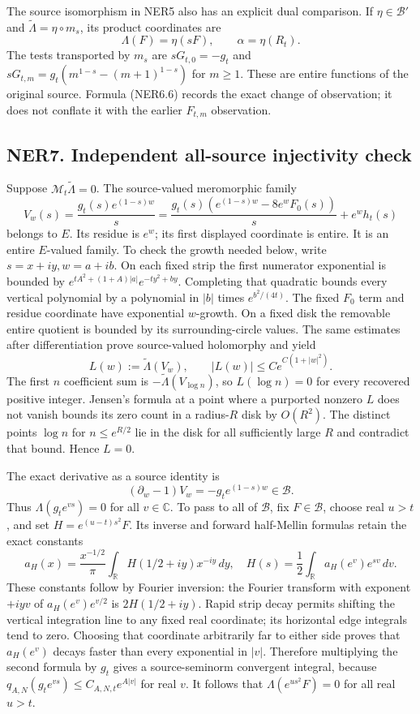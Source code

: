 The source isomorphism in NER5 also has an explicit dual comparison. If
\(\eta\in\mathcal B'\) and \(\widetilde\Lambda=\eta\circ m_s\), its
product coordinates are \[
\Lambda(F)=\eta(sF),\qquad\alpha=\eta(R_t).
\tag{NER6.6}
\] The tests transported by \(m_s\) are \(sG_{t,0}=-g_t\) and
\(sG_{t,m}=g_t(m^{1-s}-(m+1)^{1-s})\) for \(m\ge1\). These are entire
functions of the original source. Formula (NER6.6) records the exact
change of observation; it does not conflate it with the earlier
\(F_{t,m}\) observation.

\subsection{NER7. Independent all-source injectivity
check}\label{ner7.-independent-all-source-injectivity-check}

Suppose \(\mathcal M_t\widetilde\Lambda=0\). The source-valued
meromorphic family \[
V_w(s)=\frac{g_t(s)e^{(1-s)w}}s
=\frac{g_t(s)(e^{(1-s)w}-8e^wF_0(s))}s+e^wh_t(s)
\tag{NER7.1}
\] belongs to \(E\). Its residue is \(e^w\); its first displayed
coordinate is entire. It is an entire \(E\)-valued family. To check the
growth needed below, write \(s=x+iy,w=a+ib\). On each fixed strip the
first numerator exponential is bounded by
\(e^{tA^2+(1+A)|a|}e^{-ty^2+by}\). Completing that quadratic bounds
every vertical polynomial by a polynomial in \(|b|\) times
\(e^{b^2/(4t)}\). The fixed \(F_0\) term and residue coordinate have
exponential \(w\)-growth. On a fixed disk the removable entire quotient
is bounded by its surrounding-circle values. The same estimates after
differentiation prove source-valued holomorphy and yield \[
L(w):=\widetilde\Lambda(V_w),\qquad |L(w)|\le C e^{C(1+|w|^2)}.
\tag{NER7.2}
\] The first \(n\) coefficient sum is
\(-\widetilde\Lambda(V_{\log n})\), so \(L(\log n)=0\) for every
recovered positive integer. Jensen's formula at a point where a
purported nonzero \(L\) does not vanish bounds its zero count in a
radius-\(R\) disk by \(O(R^2)\). The distinct points \(\log n\) for
\(n\le e^{R/2}\) lie in the disk for all sufficiently large \(R\) and
contradict that bound. Hence \(L=0\).

The exact derivative as a source identity is \[
(\partial_w-1)V_w=-g_te^{(1-s)w}\in\mathcal B.
\tag{NER7.3}
\] Thus \(\Lambda(g_te^{vs})=0\) for all \(v\in\mathbb C\). To pass to
all of \(\mathcal B\), fix \(F\in\mathcal B\), choose real \(u>t\), and
set \(H=e^{(u-t)s^2}F\). Its inverse and forward half-Mellin formulas
retain the exact constants \[
a_H(x)=\frac{x^{-1/2}}\pi\int_{\mathbb R}H(1/2+iy)x^{-iy}\,dy,
\quad H(s)=\frac12\int_{\mathbb R}a_H(e^v)e^{sv}\,dv.
\tag{NER7.4}
\] These constants follow by Fourier inversion: the Fourier transform
with exponent \(+iyv\) of \(a_H(e^v)e^{v/2}\) is \(2H(1/2+iy)\). Rapid
strip decay permits shifting the vertical integration line to any fixed
real coordinate; its horizontal edge integrals tend to zero. Choosing
that coordinate arbitrarily far to either side proves that \(a_H(e^v)\)
decays faster than every exponential in \(|v|\). Therefore multiplying
the second formula by \(g_t\) gives a source-seminorm convergent
integral, because \(q_{A,N}(g_te^{vs})\le C_{A,N,t}e^{A|v|}\) for real
\(v\). It follows that \(\Lambda(e^{us^2}F)=0\) for all real \(u>t\).

